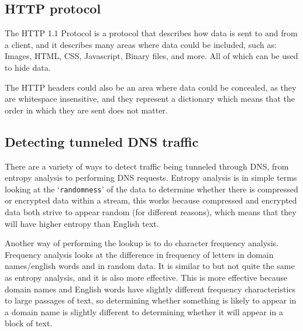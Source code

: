 \subsection{HTTP protocol}
The HTTP 1.1 Protocol\cite{rfc2616} is a protocol that describes how data is sent to and from a client, and it describes many areas where data could be included, such as:
Images,
HTML,
CSS,
Javascript,
Binary files,
and more.
All of which can be used to hide data.\par
The HTTP headers could also be an area where data could be concealed, as they are whitespace insensitive, and they represent a dictionary which means that the order in which they are sent does not matter.

\subsection{Detecting tunneled DNS traffic}
There are a variety of ways to detect traffic being tunneled through DNS, from entropy analysis to performing DNS requests\cite{detectingdns}.
Entropy analysis is in simple terms looking at the `\texttt{randomness}' of the data to determine whether there is compressed or encrypted data within a stream, this works because compressed and encrypted data both strive to appear random (for different reasons), which means that they will have higher entropy than English text.\par
Another way of performing the lookup is to do character frequency analysis\cite{freqanal}.
Frequency analysis looks at the difference in frequency of letters in domain names/english words and in random data. It is similar to but not quite the same as entropy analysis, and it is also more effective. 
This is more effective because domain names and English words have slightly different frequency characteristics to large passages of text, so determining whether something is likely to appear in a domain name is slightly different to determining whether it will appear in a block of text.

